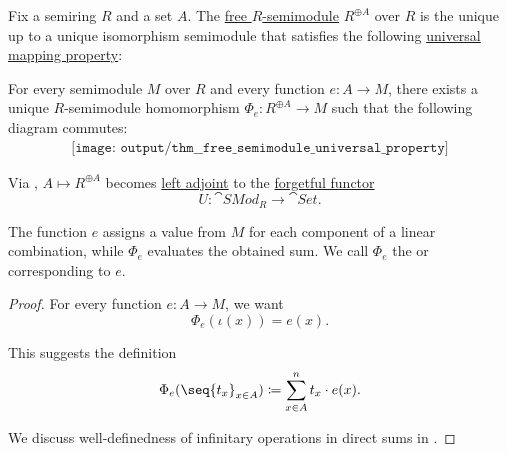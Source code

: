 \begin{theorem}\label{thm:free_semimodule_universal_property}
  Fix a semiring \( R \) and a set \( A \). The \hyperref[def:free_semimodule]{free \( R \)-semimodule} \( R^{\oplus A} \) over \( R \) is the unique up to a unique isomorphism semimodule that satisfies the following \hyperref[rem:universal_mapping_property]{universal mapping property}:
  \begin{displayquote}
    For every semimodule \( M \) over \( R \) and every function \( e: A \to M \), there exists a unique \( R \)-semimodule homomorphism \( \Phi_e: R^{\oplus A} \to M \) such that the following diagram commutes:
    \begin{equation}\label{eq:thm:free_semimodule_universal_property/diagram}
      \begin{aligned}
        \texttt{[image: output/thm\_\_free\_semimodule\_universal\_property]}
      \end{aligned}
    \end{equation}
  \end{displayquote}
\end{theorem}
\begin{comments}
  \item Via , \( A \mapsto R^{\oplus A} \) becomes \hyperref[def:category_adjunction]{left adjoint} to the \hyperref[def:concrete_category]{forgetful functor}
  \begin{equation*}
    U: \cat{SMod}_R \to \cat{Set}.
  \end{equation*}

  \item The function \( e \) assigns a value from \( M \) for each component of a linear combination, while \( \Phi_e \) evaluates the obtained sum. We call \( \Phi_e \) the  or  corresponding to \( e \).
\end{comments}
\begin{proof}
  For every function \( e: A \to M \), we want
  \begin{equation*}
    \Phi_e(\iota(x)) = e(x).
  \end{equation*}

  This suggests the definition
  \begin{equation*}
    \Phi_e(\seq{ t_x }_{x \in A}) \coloneqq \sum_{x \in A}^n t_x \cdot e(x).
  \end{equation*}

  We discuss well-definedness of infinitary operations in direct sums in .
\end{proof}

